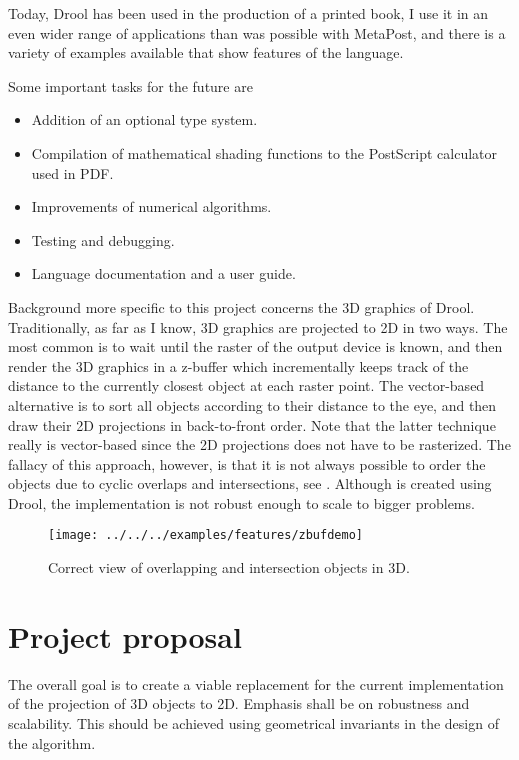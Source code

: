 \documentclass[a4paper]{article}
\begin{document}
Today, Drool has been used in the production of a printed book, I use it in an even wider range of applications than was possible with MetaPost, and there is a variety of examples available that show features of the language.

Some important tasks for the future are
\begin{itemize}
\item Addition of an optional type system.
\item Compilation of mathematical shading functions to the PostScript calculator used in PDF.
\item Improvements of numerical algorithms.
\item Testing and debugging.
\item Language documentation and a user guide.
\end{itemize}

Background more specific to this project concerns the 3D graphics of Drool.  Traditionally, as far as I know, 3D graphics are projected to 2D in two ways.  The most common is to wait until the raster of the output device is known, and then render the 3D graphics in a z-buffer which incrementally keeps track of the distance to the currently closest object at each raster point.  The vector-based alternative is to sort all objects according to their distance to the eye, and then draw their 2D projections in back-to-front order.  Note that the latter technique really is vector-based since the 2D projections does not have to be rasterized.  The fallacy of this approach, however, is that it is not always possible to order the objects due to cyclic overlaps and intersections, see .  Although  is created using Drool, the implementation is not robust enough to scale to bigger problems.

\begin{figure}[tb]
  \centering
  \texttt{[image: ../../../examples/features/zbufdemo]}
  \caption{Correct view of overlapping and intersection objects in 3D.}
\end{figure}

\section*{Project proposal}%
%
The overall goal is to create a viable replacement for the current implementation of the projection of 3D objects to 2D.  Emphasis shall be on robustness and scalability.  This should be achieved using geometrical invariants in the design of the algorithm.
\end{document}
